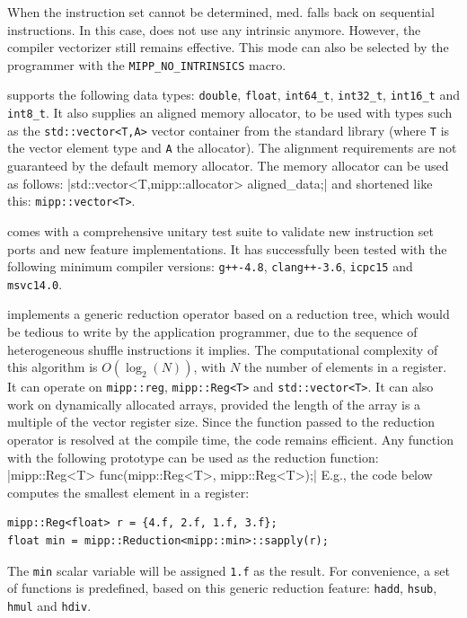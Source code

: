 When the instruction set cannot be determined, \MIPP med. falls back on
sequential instructions. In this case, \MIPP does not use any intrinsic anymore.
However, the compiler vectorizer still remains effective. This mode can also be
selected by the programmer with the \verb|MIPP_NO_INTRINSICS| macro.

\MIPP supports the following data types: \verb|double|, \verb|float|,
\verb|int64_t|, \verb|int32_t|, \verb|int16_t| and \verb|int8_t|. It also
supplies an aligned memory allocator, to be used with types such as the
\verb|std::vector<T,A>| vector container from the \Cxx standard library (where
\verb|T| is the vector element type and \verb|A| the allocator). The alignment
requirements are not guaranteed by the default \Cxx memory allocator. The \MIPP
memory allocator can be used as follows:
|std::vector<T,mipp::allocator> aligned_data;|
and shortened like this: \verb|mipp::vector<T>|.

\MIPP comes with a comprehensive unitary test suite to validate new instruction
set ports and new feature implementations. It has successfully been tested with
the following minimum compiler versions: \verb|g++-4.8|, \verb|clang++-3.6|,
\verb|icpc15| and \verb|msvc14.0|.

\MIPP implements a generic reduction operator based on a reduction tree, which
would be tedious to write by the application programmer, due to the sequence of
heterogeneous shuffle instructions it implies. The computational complexity of
this algorithm is $O(\log_2(N))$, with $N$ the number of elements in a register.
It can operate on \verb|mipp::reg|, \verb|mipp::Reg<T>| and
\verb|std::vector<T>|. It can also work on dynamically allocated arrays,
provided the length of the array is a multiple of the vector register size.
Since the function passed to the reduction operator is resolved at the compile
time, the code remains efficient. Any function with the following prototype can
be used as the reduction function:
|mipp::Reg<T> func(mipp::Reg<T>, mipp::Reg<T>);|
E.g., the code below computes the smallest element in a register:
\begin{verbatim}
mipp::Reg<float> r = {4.f, 2.f, 1.f, 3.f};
float min = mipp::Reduction<mipp::min>::sapply(r);
\end{verbatim}
The \verb|min| scalar variable will be assigned \verb|1.f| as the result. For
convenience, a set of functions is predefined, based on this generic reduction
feature: \verb|hadd|, \verb|hsub|, \verb|hmul| and \verb|hdiv|.

